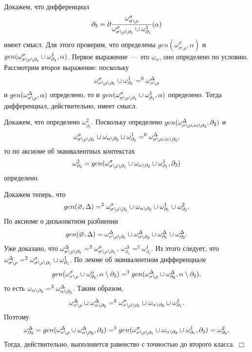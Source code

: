 Докажем, что дифференциал $$\partial_2 = \partial\dfrac{\omega^\sigma_{\sigma\setminus\rho}}{\omega^\sigma_{{\sigma\setminus\rho\setminus\partial_1}} \cup \omega^1_{\partial_1}}(\alpha)$$ 
имеет смысл. Для этого проверим, что определены $gen(\omega^\sigma_{\sigma\setminus\rho}, \alpha)$ и $gen(\omega^\sigma_{{\sigma\setminus\rho\setminus\partial_1}} \cup \omega^1_{\partial_1}, \alpha)$. Первое выражение~--- это $\omega_\alpha$, оно определено по условию. Рассмотрим второе выражение: поскольку $$\omega^\sigma_{{\sigma\setminus\rho\setminus\partial_1}} \cup \omega^1_{\partial_1} =^0 \omega^\Delta_{{\sigma\setminus\rho}}$$ 
и $gen(\omega^\Delta_{{\sigma\setminus\rho}}, \alpha)$ определено, то и $gen(\omega^\sigma_{{\sigma\setminus\rho\setminus\partial_1}} \cup \omega^1_{\partial_1}, \alpha)$ определено. Тогда дифференциал, действительно, имеет смысл.

Докажем, что определено $\omega^2_{\partial_2}$. Поскольку определено $gen(\omega^\Delta_{{\sigma\setminus\rho} \cup {\alpha\setminus{\partial_2}}}, \partial_2)$ и $$\omega^\sigma_{{\sigma\setminus\rho\setminus\partial_1}} \cup \omega_{{\alpha\setminus{\partial_2}}} \cup \omega^1_{\partial_1} =^0 \omega^\Delta_{{\sigma\setminus\rho} \cup {\alpha\setminus{\partial_2}}},$$ то по аксиоме об эквивалентных контекстах $$\omega^2_{\partial_2} = gen(\omega^\sigma_{{\sigma\setminus\rho\setminus\partial_1}} \cup \omega_{{\alpha\setminus{\partial_2}}} \cup \omega^1_{\partial_1}, \partial_2)$$ 
определено.

Докажем теперь, что $$gen(\varnothing, \Delta) =^2 \omega^\sigma_{{\sigma\setminus\rho\setminus\partial_1}} \cup \omega_{{\alpha\setminus{\partial_2}}} \cup \omega^1_{\partial_1} \cup \omega^2_{\partial_2}.$$ 
По аксиоме о дизъюнктном разбиении $$gen(\varnothing, \Delta) = \omega^\Delta_{\sigma\setminus\rho\setminus\partial_1} \cup \omega^\Delta_{\alpha\setminus{\partial_2}} \cup \omega^\Delta_{\partial_1} \cup \omega^\Delta_{\partial_2}.$$ 
Уже доказано, что $\omega^\Delta_{{\sigma\setminus\rho\setminus\partial_1}} =^2 \omega^\sigma_{{\sigma\setminus\rho\setminus\partial_1}}$, $\omega^\Delta_{\partial_1} =^2 \omega^1_{\partial_1}$. Из этого следует, что $\omega^\Delta_{{\sigma\setminus\rho}} =^2 \omega^\sigma_{{\sigma\setminus\rho\setminus\partial_1}} \cup \omega^1_{\partial_1}$. По лемме об эквивалентном дифференциале $$gen(\omega^\sigma_{{\sigma\setminus\rho}} \cup \omega^\alpha_{\partial_2}, {\alpha\setminus{\partial_2}}) =^3 gen(\omega^\Delta_{\sigma\setminus\rho} \cup \omega^\Delta_{\partial_2}, {\alpha\setminus{\partial_2}}),$$ 
то есть $\omega_{{\alpha\setminus{\partial_2}}} =^3 \omega^\Delta_{{\alpha\setminus{\partial_2}}}$. Таким образом, $$\omega^\Delta_{{\sigma\setminus\rho}} \cup \omega^\Delta_{{\alpha\setminus{\partial_2}}} =^2 \omega^\sigma_{{\sigma\setminus\rho\setminus\partial_1}} \cup \omega_{{\alpha\setminus{\partial_2}}} \cup \omega^1_{\partial_1}.$$ 
Поэтому $$\omega^\Delta_{\partial_2} = gen(\omega^\Delta_{{\sigma\setminus\rho}} \cup \omega^\Delta_{{\alpha\setminus{\partial_2}}}, \partial_2) =^3 gen(\omega^\sigma_{{\sigma\setminus\rho\setminus\partial_1}} \cup \omega_{{\alpha\setminus{\partial_2}}} \cup \omega^1_{\partial_1}, \partial_2) = \omega^2_{\partial_2}.$$ 
Тогда, действительно, выполняется равенство с точностью до второго класса. $\Box$\\
 
